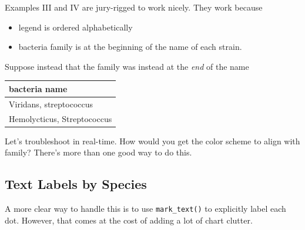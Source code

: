 \documentclass[
  letterpaper,
  DIV=11,
  numbers=noendperiod]{scrartcl}
\providecommand{\tightlist}{%
  \setlength{\itemsep}{0pt}\setlength{\parskip}{0pt}}\usepackage{longtable,booktabs,array}
\begin{document}
Examples III and IV are jury-rigged to work nicely. They work because

\begin{itemize}
\tightlist
\item
  legend is ordered alphabetically
\item
  bacteria family is at the beginning of the name of each strain.
\end{itemize}

Suppose instead that the family was instead at the \emph{end} of the
name

\begin{longtable}[]{@{}l@{}}
\toprule\noalign{}
bacteria name \\
\midrule\noalign{}
\endhead
\bottomrule\noalign{}
\endlastfoot
Viridans, streptococcus \\
Hemolycticus, Streptococcus \\
\end{longtable}

Let's troubleshoot in real-time. How would you get the color scheme to
align with family? There's more than one good way to do this.

\subsection{Text Labels by Species}\label{text-labels-by-species}

A more clear way to handle this is to use \texttt{mark\_text()} to
explicitly label each dot. However, that comes at the cost of adding a
lot of chart clutter.
\end{document}
